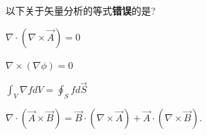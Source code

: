 \documentclass{njustexam}
\begin{document}





\begin{problem}
  以下关于矢量分析的等式\textbf{错误}的是? 
  \begin{abcd}
    \item $\nabla \cdot (\nabla \times \vec{A}) = 0$
    \item $\nabla \times (\nabla \phi) = 0$
    \item $\int_V \nabla f d V=\oint_S f d \vec{S}$
    \item $\nabla \cdot(\vec{A} \times \vec{B})=\vec{B} \cdot(\nabla \times \vec{A})
    +\vec{A} \cdot(\nabla \times \vec{B}).
$
  \end{abcd}
\end{problem}


\end{document}
